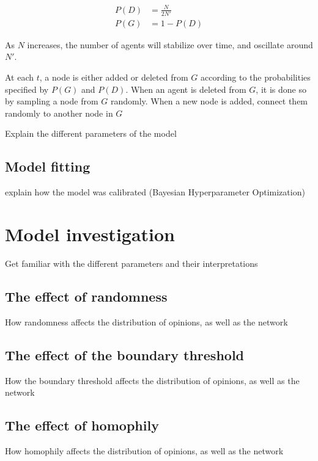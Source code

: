 \documentclass[9pt,twocolumn,twoside]{ilcss}
\begin{document}
\begin{figure}[h]
	\begin{align*}
	P(D)& = \frac{N}{2N'}\\
	P(G)& = 1 - P(D)
	\end{align*}
\end{figure}

As $N$ increases, the number of agents will stabilize over time, and oscillate around $N'$. 

At each $t$, a node is either added or deleted from $G$ according to the probabilities specified by $P(G)$ and $P(D)$.
When an agent is deleted from $G$, it is done so by sampling a node from $G$ randomly.
When a new node is added, connect them randomly to another node in $G$

Explain the different parameters of the model

\subsection{Model fitting}

explain how the model was calibrated (Bayesian Hyperparameter Optimization)

\section{Model investigation}

Get familiar with the different parameters and their interpretations

\subsection{The effect of randomness}

How randomness affects the distribution of opinions, as well as the network

\subsection{The effect of the boundary threshold}

How the boundary threshold affects the distribution of opinions, as well as the network

\subsection{The effect of homophily}

How homophily affects the distribution of opinions, as well as the network
\end{document}
